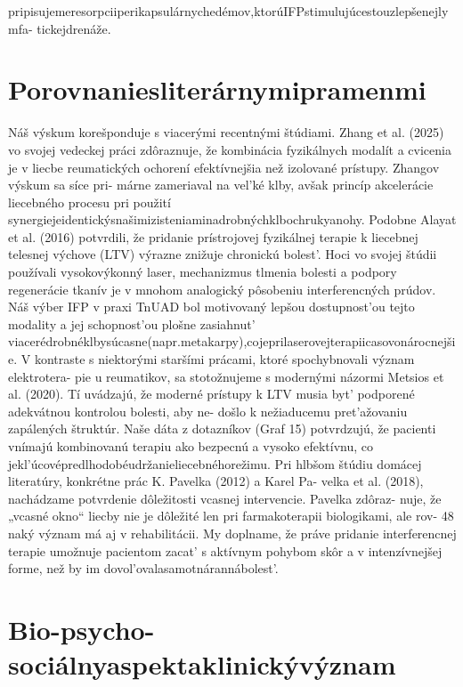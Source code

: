 pripisujemeresorpciiperikapsulárnychedémov,ktorúIFPstimulujúcestouzlepšenejlymfa- tickejdrenáže.


\section{Porovnaniesliterárnymipramenmi}

Náš výskum korešponduje s viacerými recentnými štúdiami. Zhang et al. (2025) vo svojej vedeckej práci zdôraznuje, že kombinácia fyzikálnych modalít a cvicenia je v liecbe reumatických ochorení efektívnejšia než izolované prístupy. Zhangov výskum sa síce pri- márne zameriaval na vel’ké klby, avšak princíp akcelerácie liecebného procesu pri použití synergiejeidentickýsnašimizisteniaminadrobnýchklbochrukyanohy. Podobne Alayat et al. (2016) potvrdili, že pridanie prístrojovej fyzikálnej terapie k liecebnej telesnej výchove (LTV) výrazne znižuje chronickú bolest’. Hoci vo svojej štúdii používali vysokovýkonný laser, mechanizmus tlmenia bolesti a podpory regenerácie tkanív je v mnohom analogický pôsobeniu interferencných prúdov. Náš výber IFP v praxi TnUAD bol motivovaný lepšou dostupnost’ou tejto modality a jej schopnost’ou plošne zasiahnut’ viacerédrobnéklbysúcasne(napr.metakarpy),cojeprilaserovejterapiicasovonárocnejšie. V kontraste s niektorými staršími prácami, ktoré spochybnovali význam elektrotera- pie u reumatikov, sa stotožnujeme s modernými názormi Metsios et al. (2020). Tí uvádzajú, že moderné prístupy k LTV musia byt’ podporené adekvátnou kontrolou bolesti, aby ne- došlo k nežiaducemu pret’ažovaniu zapálených štruktúr. Naše dáta z dotazníkov (Graf 15) potvrdzujú, že pacienti vnímajú kombinovanú terapiu ako bezpecnú a vysoko efektívnu, co jekl’úcovépredlhodobéudržanieliecebnéhorežimu. Pri hlbšom štúdiu domácej literatúry, konkrétne prác K. Pavelka (2012) a Karel Pa- velka et al. (2018), nachádzame potvrdenie dôležitosti vcasnej intervencie. Pavelka zdôraz- nuje, že „vcasné okno“ liecby nie je dôležité len pri farmakoterapii biologikami, ale rov- 48 naký význam má aj v rehabilitácii. My doplname, že práve pridanie interferencnej terapie umožnuje pacientom zacat’ s aktívnym pohybom skôr a v intenzívnejšej forme, než by im dovol’ovalasamotnárannábolest’.


\section{Bio-psycho-sociálnyaspektaklinickývýznam}

